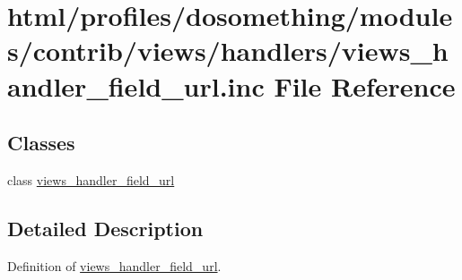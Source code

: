 \hypertarget{views__handler__field__url_8inc}{
\section{html/profiles/dosomething/modules/contrib/views/handlers/views\_\-handler\_\-field\_\-url.inc File Reference}
\label{views__handler__field__url_8inc}
}
\subsection*{Classes}
\begin{DoxyCompactItemize}
\item 
class \hyperlink{classviews__handler__field__url}{views\_\-handler\_\-field\_\-url}
\end{DoxyCompactItemize}


\subsection{Detailed Description}
Definition of \hyperlink{classviews__handler__field__url}{views\_\-handler\_\-field\_\-url}. 